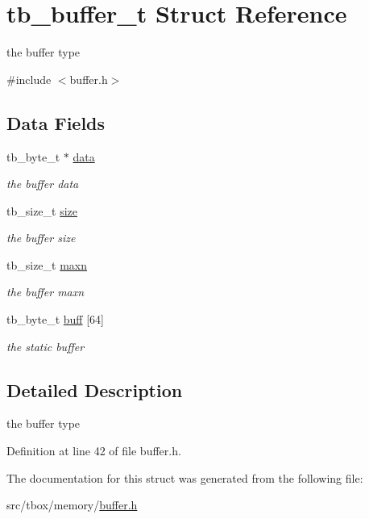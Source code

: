 \hypertarget{structtb__buffer__t}{\section{tb\-\_\-buffer\-\_\-t Struct Reference}
\label{structtb__buffer__t}
}


the buffer type  




{\ttfamily \#include $<$buffer.\-h$>$}

\subsection*{Data Fields}
\begin{DoxyCompactItemize}
\item 
\hypertarget{structtb__buffer__t_a5f1efeed4494983d9c62094f24ea8033}{tb\-\_\-byte\-\_\-t $\ast$ \hyperlink{structtb__buffer__t_a5f1efeed4494983d9c62094f24ea8033}{data}}\label{structtb__buffer__t_a5f1efeed4494983d9c62094f24ea8033}

\begin{DoxyCompactList}\small\item\em the buffer data \end{DoxyCompactList}\item 
\hypertarget{structtb__buffer__t_af38b01ee8762cefe8cdb166e3434b6fa}{tb\-\_\-size\-\_\-t \hyperlink{structtb__buffer__t_af38b01ee8762cefe8cdb166e3434b6fa}{size}}\label{structtb__buffer__t_af38b01ee8762cefe8cdb166e3434b6fa}

\begin{DoxyCompactList}\small\item\em the buffer size \end{DoxyCompactList}\item 
\hypertarget{structtb__buffer__t_a9e6b41c9165878dbbd9bbf7f5e7199e7}{tb\-\_\-size\-\_\-t \hyperlink{structtb__buffer__t_a9e6b41c9165878dbbd9bbf7f5e7199e7}{maxn}}\label{structtb__buffer__t_a9e6b41c9165878dbbd9bbf7f5e7199e7}

\begin{DoxyCompactList}\small\item\em the buffer maxn \end{DoxyCompactList}\item 
\hypertarget{structtb__buffer__t_a510efb4034ddf05d9b626fb010a8b888}{tb\-\_\-byte\-\_\-t \hyperlink{structtb__buffer__t_a510efb4034ddf05d9b626fb010a8b888}{buff} \mbox{[}64\mbox{]}}\label{structtb__buffer__t_a510efb4034ddf05d9b626fb010a8b888}

\begin{DoxyCompactList}\small\item\em the static buffer \end{DoxyCompactList}\end{DoxyCompactItemize}


\subsection{Detailed Description}
the buffer type 

Definition at line 42 of file buffer.\-h.



The documentation for this struct was generated from the following file\-:\begin{DoxyCompactItemize}
\item 
src/tbox/memory/\hyperlink{buffer_8h}{buffer.\-h}\end{DoxyCompactItemize}
